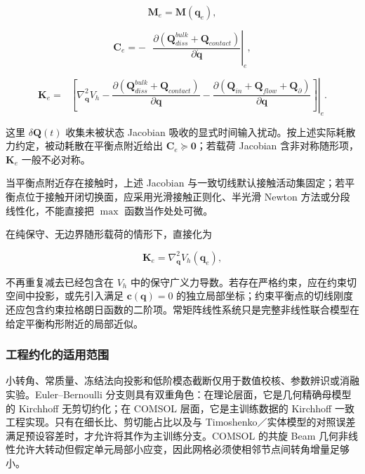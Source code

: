 \begin{equation}
\label{eq:galerkin-2-111}
\mathbf{M}_{e} = \mathbf{M}\left( \mathbf{q}_{e} \right),
\end{equation}

\begin{equation}
\label{eq:galerkin-2-112}
\mathbf{C}_{e} = - \left. \ \ \ \frac{\partial\left(\mathbf{Q}_{diss}^{bulk}+\mathbf{Q}_{contact}\right)}{\partial\dot{\mathbf{q}}} \right|_{e},
\end{equation}

\begin{equation}
\label{eq:galerkin-2-113}
\boxed{\mathbf{K}_{e} = \left. \ \ \ \left\lbrack \nabla_{\mathbf{q}}^{2}V_{h} - \frac{\partial\left(\mathbf{Q}_{diss}^{bulk}+\mathbf{Q}_{contact}\right)}{\partial\mathbf{q}} - \frac{\partial\left( \mathbf{Q}_{in} + \mathbf{Q}_{flow} + \mathbf{Q}_{\partial} \right)}{\partial\mathbf{q}} \right\rbrack \right|_{e}.}
\end{equation}

这里 \(\delta\mathbf{Q}(t)\) 收集未被状态 Jacobian 吸收的显式时间输入扰动。按上述实际耗散力约定，被动耗散在平衡点附近给出 \(\mathbf{C}_{e} \succcurlyeq \mathbf{0}\)；若载荷 Jacobian 含非对称随形项，\(\mathbf{K}_{e}\) 一般不必对称。

当平衡点附近存在接触时，上述 Jacobian 与一致切线默认接触活动集固定；若平衡点位于接触开闭切换面，应采用光滑接触正则化、半光滑 Newton 方法或分段线性化，不能直接把 \(\max\) 函数当作处处可微。

在纯保守、无边界随形载荷的情形下，直接化为

\begin{equation}
\label{eq:galerkin-2-114}
\boxed{\mathbf{K}_{e} = \nabla_{\mathbf{q}}^{2}V_{h}\left( \mathbf{q}_{e} \right),}
\end{equation}

不再重复减去已经包含在 \(V_{h}\) 中的保守广义力导数。若存在严格约束，应在约束切空间中投影，或先引入满足 \(\mathbf{c}\left( \mathbf{q} \right) = 0\) 的独立局部坐标；约束平衡点的切线刚度还应包含约束拉格朗日函数的二阶项。常矩阵线性系统只是完整非线性联合模型在给定平衡构形附近的局部近似。\cite{MarsdenRatiu1999MechanicsSymmetry,HairerLubichWanner2006GNI}

\subsubsection{工程约化的适用范围}\label{sec:galerkin-2-10-2}

小转角、常质量、冻结法向投影和低阶模态截断仅用于数值校核、参数辨识或消融实验。Euler--Bernoulli 分支则具有双重角色：在理论层面，它是几何精确母模型的 Kirchhoff 无剪切约化；在 COMSOL 层面，它是主训练数据的 Kirchhoff 一致工程实现。只有在细长比、剪切能占比以及与 Timoshenko／实体模型的对照误差满足预设容差时，才允许将其作为主训练分支。COMSOL 的共旋 Beam 几何非线性允许大转动但假定单元局部小应变，因此网格必须使相邻节点间转角增量足够小\cite{COMSOLBeamInterface2025,COMSOLGeometricNonlinearity2025}。


